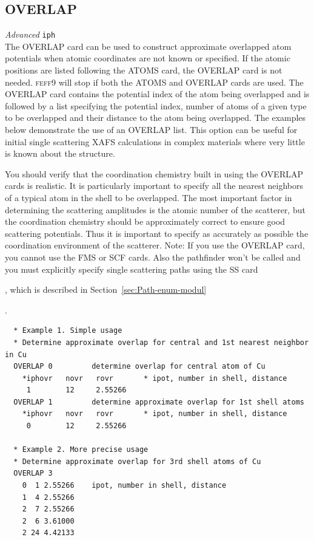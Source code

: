 \documentclass[11pt,oneside]{report} %
\renewcommand{\htmlref}[2]{\hyperlink{#2}{#1}}
\newcommand{\program}[1]{\textsc{#1}}
\newcommand{\feff}{\program{feff}}
\newcommand{\vnum}{9}
\newcommand{\feffcur}{\feff\vnum}
\newenvironment{Card}[4]%
      {\vspace{3ex}%
        \subsection{#1}
        \quad\textsl{#3}\newline
        \quad\texttt{#2}\newline%
        \label{card:#4}\\}
      {}
\renewcommand{\htmlref}[2]{{#1}} %
\begin{document}
\begin{Card}{OVERLAP}{iph}{Advanced}{ove}
  The OVERLAP card can be used to construct approximate overlapped
  atom potentials when atomic coordinates are not known or specified.
  If the atomic positions are listed following the \htmlref{ATOMS}{card:ato} 
  card, the OVERLAP card is not needed. {\feffcur} will stop if both 
  the ATOMS and OVERLAP cards are used. The OVERLAP card contains the 
  potential index of the atom being overlapped and is followed by a list
  specifying the potential index, number of atoms of a given type to
  be overlapped and their distance to the atom being overlapped. The
  examples below demonstrate the use of an OVERLAP list. This option
  can be useful for initial single scattering XAFS calculations in
  complex materials where very little is known about the structure.

  You should verify that the coordination chemistry built in using the
  OVERLAP cards is realistic. It is particularly important to specify
  all the nearest neighbors of a typical atom in the shell to be
  overlapped. The most important factor in determining the scattering
  amplitudes is the atomic number of the scatterer, but the coordination 
  chemistry should be approximately correct to ensure good scattering 
  potentials. Thus it is important to specify as accurately as possible 
  the coordination environment of the scatterer. Note: If you use the 
  OVERLAP card, you cannot use the \htmlref{FMS}{card:fms} or 
  \htmlref{SCF}{card:scf} cards. Also the pathfinder won't be called 
  and you must explicitly specify single scattering paths using the 
  \htmlref{SS}{card:ss} card
  \begin{latexonly}
   , which is described in Section~\ref{sec:Path-enum-modul}
  \end{latexonly}.

\begin{verbatim}
  * Example 1. Simple usage
  * Determine approximate overlap for central and 1st nearest neighbor in Cu
  OVERLAP 0         determine overlap for central atom of Cu
    *iphovr   novr   rovr       * ipot, number in shell, distance
     1        12     2.55266
  OVERLAP 1         determine approximate overlap for 1st shell atoms
    *iphovr   novr   rovr       * ipot, number in shell, distance
     0        12     2.55266

  * Example 2. More precise usage
  * Determine approximate overlap for 3rd shell atoms of Cu
  OVERLAP 3
    0  1 2.55266    ipot, number in shell, distance
    1  4 2.55266
    2  7 2.55266
    2  6 3.61000
    2 24 4.42133
\end{verbatim}
\end{Card}
\end{document}
